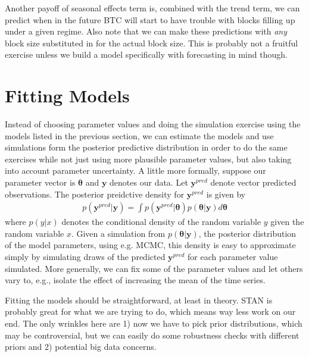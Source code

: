 \documentclass{article}
\begin{document}
Another payoff of seasonal effects term is, combined with the trend term, we can predict when in the future BTC will start to have trouble with blocks filling up under a given regime. Also note that we can make these predictions with {\it any} block size substituted in for the actual block size. This is probably not a fruitful exercise unless we build a model specifically with forecasting in mind though.

\section{Fitting Models}
Instead of choosing parameter values and doing the simulation exercise using the models listed in the previous section, we can estimate the models and use simulations form the posterior predictive distribution in order to do the same exercises while not just using more plausible parameter values, but also taking into account parameter uncertainty. A little more formally, suppose our parameter vector is $\bm{\theta}$ and $\bm{y}$ denotes our data. Let $\bm{y}^{pred}$ denote vector predicted observations. The posterior preidctive density for $\bm{y}^{pred}$ is given by
\begin{align*}
p(\bm{y}^{pred}|\bm{y}) = \int p(\bm{y}^{pred}|\bm{\theta})p(\bm{\theta}|\bm{y}) d\bm{\theta}
\end{align*}
where $p(y|x)$ denotes the conditional density of the random variable $y$ given the random variable $x$. Given a simulation from $p(\bm{\theta}|\bm{y})$, the posterior distribution of the model parameters, using e.g. MCMC, this density is easy to approximate simply by simulating draws of the predicted $\bm{y}^{pred}$ for each parameter value simulated. More generally, we can fix some of the parameter values and let others vary to, e.g., isolate the effect of increasing the mean of the time series. 

Fitting the models should be straightforward, at least in theory. STAN is probably great for what we are trying to do, which means way less work on our end. The only wrinkles here are 1) now we have to pick prior distributions, which may be controversial, but we can easily do some robustness checks with different priors and 2) potential big data concerns.
\end{document}
